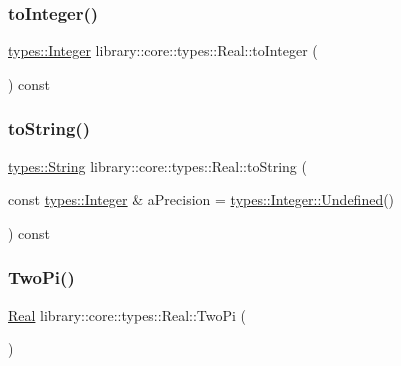\mbox{\label{classlibrary_1_1core_1_1types_1_1_real_aa4a7f3663994b5e59dc894b80856e0fb}} 
\subsubsection{\texorpdfstring{to\+Integer()}{toInteger()}}
{\footnotesize\ttfamily \hyperlink{classlibrary_1_1core_1_1types_1_1_integer}{types\+::\+Integer} library\+::core\+::types\+::\+Real\+::to\+Integer (\begin{DoxyParamCaption}{ }\end{DoxyParamCaption}) const}

\mbox{\label{classlibrary_1_1core_1_1types_1_1_real_a5d2632591e723b672323c60f1f4ec0be}} 
\subsubsection{\texorpdfstring{to\+String()}{toString()}}
{\footnotesize\ttfamily \hyperlink{classlibrary_1_1core_1_1types_1_1_string}{types\+::\+String} library\+::core\+::types\+::\+Real\+::to\+String (\begin{DoxyParamCaption}\item[{const \hyperlink{classlibrary_1_1core_1_1types_1_1_integer}{types\+::\+Integer} \&}]{a\+Precision = {\ttfamily \hyperlink{classlibrary_1_1core_1_1types_1_1_integer_a142c2df49031b787daf30673c73fcad7}{types\+::\+Integer\+::\+Undefined}()} }\end{DoxyParamCaption}) const}

\mbox{\label{classlibrary_1_1core_1_1types_1_1_real_ab6da87777d2c1c3517b3ee0c1b87f8a7}} 
\subsubsection{\texorpdfstring{Two\+Pi()}{TwoPi()}}
{\footnotesize\ttfamily \hyperlink{classlibrary_1_1core_1_1types_1_1_real}{Real} library\+::core\+::types\+::\+Real\+::\+Two\+Pi (\begin{DoxyParamCaption}{ }\end{DoxyParamCaption})\hspace{0.3cm}{\ttfamily [static]}}

